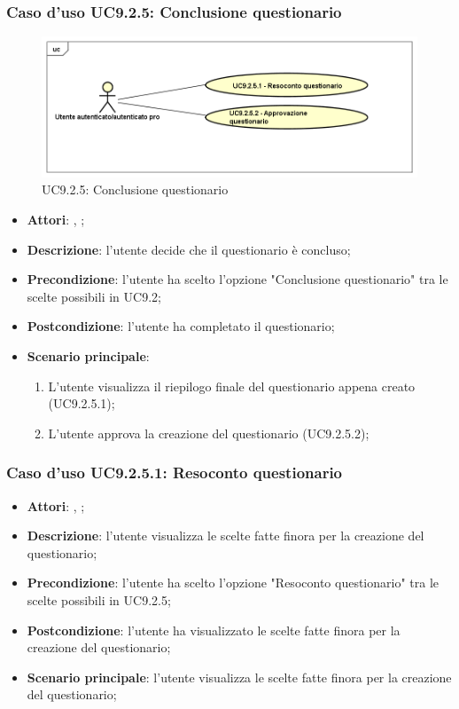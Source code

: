 		\subsubsection{Caso d'uso UC9.2.5: Conclusione questionario}
		\label{UC9.2.5}
		\begin{figure}[h]
			\centering
			\includegraphics[scale=0.5,keepaspectratio]{UML/UC9_2_5.png}
			\caption{UC9.2.5: Conclusione questionario}
		\end{figure}
		\FloatBarrier
		\begin{itemize}
			\item \textbf{Attori}: \uau, \uaupro; 
			\item \textbf{Descrizione}: l'utente decide che il questionario è concluso;
			\item \textbf{Precondizione}: l'utente ha scelto l'opzione "Conclusione questionario" tra le scelte possibili in UC9.2;
			\item \textbf{Postcondizione}: l'utente ha completato il questionario;
			\item \textbf{Scenario principale}: 
				\begin{enumerate}
					\item L'utente visualizza il riepilogo finale del questionario appena creato (UC9.2.5.1); 
					\item L'utente approva la creazione del questionario (UC9.2.5.2); 
				\end{enumerate}
		\end{itemize}
				
			\subsubsection{Caso d'uso UC9.2.5.1: Resoconto questionario}
			\label{UC9.2.5.1}
			\begin{itemize}
				\item \textbf{Attori}: \uau, \uaupro;
				\item \textbf{Descrizione}: l'utente visualizza le scelte fatte finora per la creazione del questionario;
				\item \textbf{Precondizione}: l'utente ha scelto l'opzione "Resoconto questionario" tra le scelte possibili in UC9.2.5;
				\item \textbf{Postcondizione}: l'utente ha visualizzato le scelte fatte finora per la creazione del questionario;
				\item \textbf{Scenario principale}: l'utente visualizza le scelte fatte finora per la creazione del questionario;
			\end{itemize}
			
